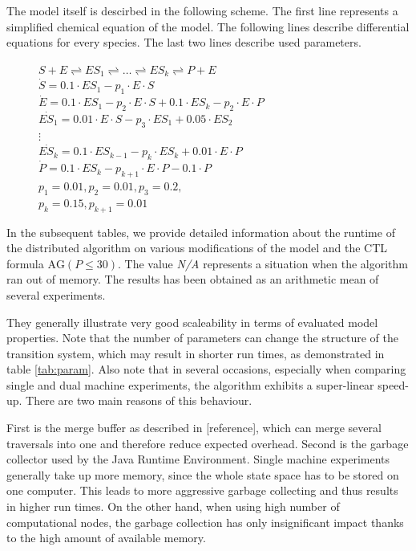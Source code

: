 \documentclass[12pt,oneside,draft]{fithesis2}
\newcommand{\ag}[1]{\ensuremath{\mbox{AG} #1}}
\begin{document}
				The model itself is descirbed in the following scheme. The first line represents a simplified chemical equation of the model. The following lines describe differential equations for every species. The last two lines describe used parameters. 				


				\begin{figure}
					\centering
					\underline{$S + E \rightleftharpoons ES_1 \rightleftharpoons \dots \rightleftharpoons ES_k \rightleftharpoons P + E$}\\
					$\dot{S}  =  0.1\cdot ES_1 - p_1\cdot E\cdot S$\\
					$\dot{E}  =  0.1\cdot ES_1 - p_2\cdot E\cdot S + 0.1\cdot ES_k - p_2\cdot E\cdot P$\\
					$\dot{ES_1} = 0.01\cdot E\cdot S - p_3\cdot ES_1 + 0.05\cdot ES_2$\\
					$\vdots $\\
					$\dot{ES_k} = 0.1\cdot ES_{k -1} - p_k\cdot ES_k + 0.01\cdot E\cdot P$\\
					\underline{$\dot{P}  =  0.1\cdot ES_k - p_{k+1}\cdot E\cdot P - 0.1\cdot P$}\\
					$p_1 = 0.01, p_2 = 0.01, p_3 = 0.2,$\\ $p_k = 0.15, p_{k+1} = 0.01$
				\end{figure}


				In the subsequent tables, we provide detailed information about the runtime of the distributed algorithm on various modifications of the model and the CTL formula $\ag{(P \leq 30)}$.  The value {\em N/A} represents a situation when the algorithm ran out of memory. The results has been obtained as an arithmetic mean of several experiments.
				
				They generally illustrate very good scaleability in terms of evaluated model properties. Note that the number of parameters can change the structure of the transition system, which may result in shorter run times, as demonstrated in table \ref{tab:param}. Also note that in several occasions, especially when comparing single and dual machine experiments, the algorithm exhibits a super-linear speed-up. There are two main reasons of this behaviour. 
				
				First is the merge buffer as described in [reference], which can merge several traversals into one and therefore reduce expected overhead. Second is the garbage collector used by the Java Runtime Environment. Single machine experiments generally take up more memory, since the whole state space has to be stored on one computer. This leads to more aggressive garbage collecting and thus results in higher run times. On the other hand, when using high number of computational nodes, the garbage collection has only insignificant impact thanks to the high amount of available memory.
				
\end{document}
